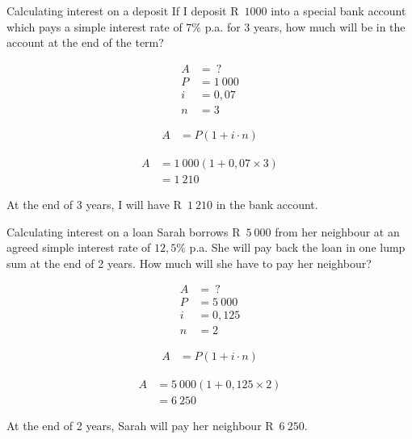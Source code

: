 


\begin{wex}{Calculating interest on a deposit}{
    If I deposit R~$1 000$ into a special bank account which pays a simple interest rate of $7\%$ p.a. for 3 years, how much will be in the account at the end of the term?}{

    \begin{align*}
	A &= ~?\\
	P &= 1~000\\
	i &= 0,07\\
	n &= 3
    \end{align*}
    
    \begin{align*}
	A &= P(1 + i \cdot n)
    \end{align*}

    \begin{align*}
	A &= 1~000(1 + 0,07 \times 3)\\
	  &= 1~210
    \end{align*}

    At the end of 3 years, I will have R~$1~210$ in the bank account.
    }
\end{wex}


\begin{wex}{Calculating interest on a loan}{
    Sarah borrows R~$5~000$ from her neighbour at an agreed simple interest rate of $12,5\%$ p.a. She will pay back the loan in one lump sum at the end of 2 years. How much will she have to pay her neighbour?}{

    \begin{align*}
	A &= ~?\\
	P &= 5~000\\
	i &= 0,125\\
	n &= 2
    \end{align*}

    \begin{align*}
	A &= P(1 + i \cdot n)
    \end{align*}

    \begin{align*}
	A &= 5~000(1 + 0,125 \times 2)\\
	  &= 6~250
    \end{align*}

    At the end of 2 years, Sarah will pay her neighbour R~$6~250$.
    }
\end{wex}


